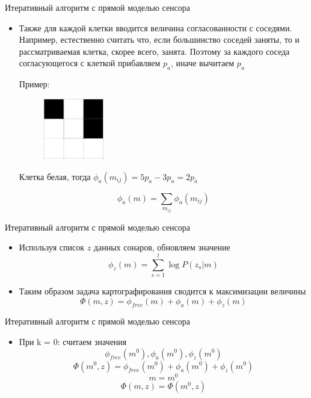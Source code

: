 \documentclass[9pt]{beamer}
\begin{document}
\begin{frame}{Итеративный алгоритм с прямой моделью сенсора}
\begin{itemize}
  \item
  {
    Также для каждой клетки вводится величина согласованности с соседями. Например, естественно считать что, если большинство соседей заняты, то и рассматриваемая клетка, скорее всего, занята. Поэтому за каждого соседа согласующегося с клеткой прибавляем $p_{a}$, иначе вычитаем $p_a$

    Пример:

    \begin{figure}[h]
      \centering
      \includegraphics[width=0.25\textwidth]{cells.png}
    \end{figure}

    Клетка белая, тогда $\phi_a(m_{ij}) = 5p_a - 3p_a = 2p_a$

    $$\phi_a(m) = \sum_{m_{ij}} \phi_a(m_{ij})$$
  }

\end{itemize}

\end{frame}


\begin{frame}{Итеративный алгоритм с прямой моделью сенсора}
\begin{itemize}
  \item
  {
    Используя список $z$ данных сонаров, обновляем значение  $$\phi_{z}(m) = \sum_{s=1}^l \log{P(z_s|m)}$$ 
  }
  \item
  {
    Таким образом задача картографирования сводится к максимизации величины $$\Phi(m, z) = \phi_{free}(m) + \phi_a(m) + \phi_{z}(m) $$
  }
  
\end{itemize}
\end{frame}


\begin{frame}{Итеративный алгоритм с прямой моделью сенсора}
\begin{itemize}
  \item
  {
    При k = 0: считаем значения 
    $$\phi_{free}(m^{0}), \phi_a(m^{0}), \phi_{z}(m^{0})$$ 
    $$\Phi(m^{0}, z) = \phi_{free}(m^{0}) + \phi_a(m^{0}) + \phi_{z}(m^{0})$$
    $$m = m^0$$
    $$\Phi(m, z) = \Phi(m^{0}, z)$$
  }
  \end{itemize}
\end{frame}
\end{document}
